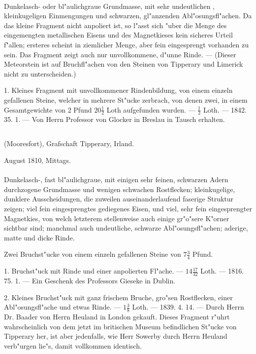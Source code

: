 \documentclass[a4paper, 11pt, oneside, polutonikogreek, german]{article}
\begin{document}
\paragraph{}
Dunkelasch- oder bl"aulichgraue Grundmasse, mit sehr undeutlichen , kleinkugeligen Einmengungen und schwarzen, gl"anzenden Abl"osungsfl"achen. Da das kleine Fragment nicht anpoliert ist, so l"asst sich "uber die Menge des eingemengten metallischen Eisens und des Magnetkieses kein sicheres Urteil f"allen; ersteres scheint in ziemlicher Menge, aber fein eingesprengt vorhanden zu sein. Das Fragment zeigt auch nur unvollkommene, d"unne Rinde. --- (Dieser Meteorstein ist auf Bruchfl"achen von den Steinen von Tipperary und Limerick nicht zu unterscheiden.)

1. Kleines Fragment mit unvollkommener Rindenbildung, von einem einzeln gefallenen Steine, welcher in mehrere St"ucke zerbrach, von denen zwei, in einem Gesamtgewichte von 2 Pfund $20\frac{1}{2}$ Loth aufgefunden wurden. --- $\frac{1}{2}$ Loth. --- 1842. 35. 1. --- Von Herrn Professor von Glocker in Breslau in Tausch erhalten.
\subsection{}
\begin{center}

(Mooresfort), Grafschaft Tipperary, Irland.

August 1810, Mittags.
\end{center}
\paragraph{}
Dunkelasch-, fast bl"aulichgraue, mit einigen sehr feinen, schwarzen Adern durchzogene Grundmasse und wenigen schwachen Rostflecken; kleinkugelige, dunklere Ausscheidungen, die zuweilen auseinanderlaufend faserige Struktur zeigen; viel fein eingesprengtes gediegenes Eisen, und viel, sehr fein eingesprengter Magnetkies, von welch letzterem stellenweise auch einige gr"o"sere K"orner sichtbar sind; manchmal auch undeutliche, schwarze Abl"osungsfl"achen; aderige, matte und dicke Rinde.

Zwei Bruchst"ucke von einem einzeln gefallenen Steine von $7\frac{3}{4}$ Pfund.

1. Bruchst"uck mit Rinde und einer anpolierten Fl"ache. --- $14\frac{17}{32}$ Loth. --- 1816. 75. 1. --- Ein Geschenk des Professors Gieseke in Dublin.

2. Kleines Bruchst"uck mit ganz frischem Bruche, gro"sen Rostflecken, einer Abl"osungsfl"ache und etwas Rinde. --- $1\frac{3}{8}$ Loth. --- 1839. 4. 14. --- Durch Herrn Dr. Baader von Herrn Heuland in London gekauft. Dieses Fragment r"uhrt wahrscheinlich von dem jetzt im britischen Museum befindlichen St"ucke von Tipperary her, ist aber jedenfalls, wie Herr Sowerby durch Herrn Heuland verb"urgen lie"s, damit vollkommen identisch.
\end{document}
